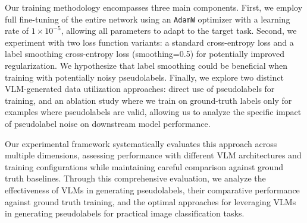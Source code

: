 \documentclass[../ShajiS_RnDReport.tex]{subfiles}
\begin{document}
Our training methodology encompasses three main components. First, we employ full fine-tuning of the entire network using an \texttt{AdamW} optimizer with a learning rate of \(1 \times 10^{-5}\), allowing all parameters to adapt to the target task. Second, we experiment with two loss function variants: a standard cross-entropy loss and a label smoothing cross-entropy loss (smoothing=0.5) for potentially improved regularization. We hypothesize that label smoothing could be beneficial when training with potentially noisy pseudolabels. Finally, we explore two distinct VLM-generated data utilization approaches: direct use of pseudolabels for training, and an ablation study where we train on ground-truth labels only for examples where pseudolabels are valid, allowing us to analyze the specific impact of pseudolabel noise on downstream model performance.

Our experimental framework systematically evaluates this approach across multiple dimensions, assessing performance with different VLM architectures and training configurations while maintaining careful comparison against ground truth baselines. Through this comprehensive evaluation, we analyze the effectiveness of VLMs in generating pseudolabels, their comparative performance against ground truth training, and the optimal approaches for leveraging VLMs in generating pseudolabels for practical image classification tasks.
   
\end{document}

